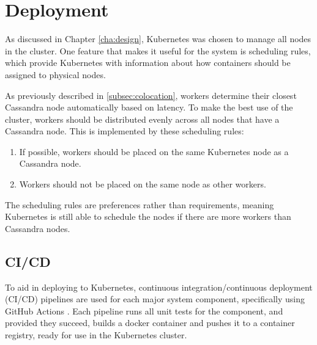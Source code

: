 \section{Deployment}
As discussed in Chapter \ref{cha:design}, Kubernetes was chosen to manage all nodes in the cluster. One feature that makes it useful for the system is scheduling rules, which provide Kubernetes with information about how containers should be assigned to physical nodes.

As previously described in \ref{subsec:colocation}, workers determine their closest Cassandra node automatically based on latency. To make the best use of the cluster, workers should be distributed evenly across all nodes that have a Cassandra node. This is implemented by these scheduling rules:
\begin{enumerate}
	\item If possible, workers should be placed on the same Kubernetes node as a Cassandra node.
	\item Workers should not be placed on the same node as other workers.
\end{enumerate}

The scheduling rules are preferences rather than requirements, meaning Kubernetes is still able to schedule the nodes if there are more workers than Cassandra nodes.

\subsection{CI/CD}
To aid in deploying to Kubernetes, continuous integration/continuous deployment (CI/CD) pipelines are used for each major system component, specifically using GitHub Actions \cite{githubactions}. Each pipeline runs all unit tests for the component, and provided they succeed, builds a docker container and pushes it to a container registry, ready for use in the Kubernetes cluster.

